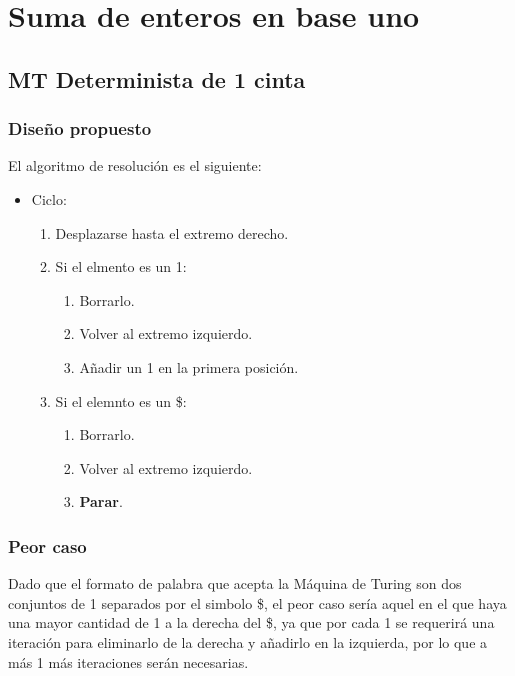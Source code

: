\section{Suma de enteros en base uno}


\subsection{MT Determinista de 1 cinta}

\subsubsection*{Diseño propuesto}
El algoritmo de resolución es el siguiente:

\begin{itemize}
    \item Ciclo:
    \begin{enumerate}[1.]
        \item Desplazarse hasta el extremo derecho.
        \item Si el elmento es un 1:
        \begin{enumerate}[1.]
            \item Borrarlo.
            \item Volver al extremo izquierdo.
            \item Añadir un 1 en la primera posición.
        \end{enumerate}
        \item Si el elemnto es un \$:
        \begin{enumerate}[1.]
            \item Borrarlo.
            \item Volver al extremo izquierdo.
            \item \textbf{Parar}.
        \end{enumerate}
    \end{enumerate}
\end{itemize}



\subsubsection*{Peor caso}
Dado que el formato de palabra que acepta la Máquina de Turing son dos conjuntos de 1 separados por el simbolo \$, el peor caso sería aquel en el que haya una mayor cantidad de 1 a la derecha del \$, ya que por cada 1 se requerirá una iteración para eliminarlo de la derecha y añadirlo en la izquierda, por lo que a más 1 más iteraciones serán necesarias.

